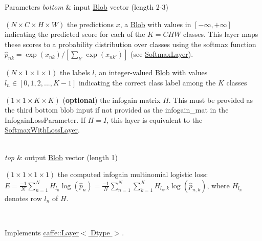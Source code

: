 \begin{DoxyParams}{Parameters}
{\em bottom} & input \hyperlink{classcaffe_1_1Blob}{Blob} vector (length 2-\/3)
\begin{DoxyEnumerate}
\item $ (N \times C \times H \times W) $ the predictions $ x $, a \hyperlink{classcaffe_1_1Blob}{Blob} with values in $ [-\infty, +\infty] $ indicating the predicted score for each of the $ K = CHW $ classes. This layer maps these scores to a probability distribution over classes using the softmax function $ \hat{p}_{nk} = \exp(x_{nk}) / \left[\sum_{k'} \exp(x_{nk'})\right] $ (see \hyperlink{classcaffe_1_1SoftmaxLayer}{Softmax\+Layer}).
\item $ (N \times 1 \times 1 \times 1) $ the labels $ l $, an integer-\/valued \hyperlink{classcaffe_1_1Blob}{Blob} with values $ l_n \in [0, 1, 2, ..., K - 1] $ indicating the correct class label among the $ K $ classes
\item $ (1 \times 1 \times K \times K) $ ({\bfseries optional}) the infogain matrix $ H $. This must be provided as the third bottom blob input if not provided as the infogain\+\_\+mat in the Infogain\+Loss\+Parameter. If $ H = I $, this layer is equivalent to the \hyperlink{classcaffe_1_1SoftmaxWithLossLayer}{Softmax\+With\+Loss\+Layer}. 
\end{DoxyEnumerate}\\
\hline
{\em top} & output \hyperlink{classcaffe_1_1Blob}{Blob} vector (length 1)
\begin{DoxyEnumerate}
\item $ (1 \times 1 \times 1 \times 1) $ the computed infogain multinomial logistic loss\+: $ E = \frac{-1}{N} \sum\limits_{n=1}^N H_{l_n} \log(\hat{p}_n) = \frac{-1}{N} \sum\limits_{n=1}^N \sum\limits_{k=1}^{K} H_{l_n,k} \log(\hat{p}_{n,k}) $, where $ H_{l_n} $ denotes row $l_n$ of $H$. 
\end{DoxyEnumerate}\\
\hline
\end{DoxyParams}


Implements \hyperlink{classcaffe_1_1Layer_add965883f75bbf90c7a06f960cda7a1a}{caffe\+::\+Layer$<$ Dtype $>$}.

